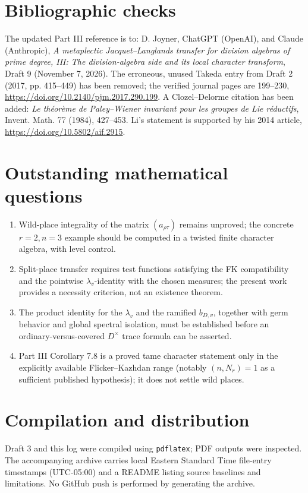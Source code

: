 \documentclass[11pt]{article}
\begin{document}
\section*{Bibliographic checks}
The updated Part III reference is to: D. Joyner, ChatGPT (OpenAI),
and Claude (Anthropic), \emph{A metaplectic Jacquet--Langlands transfer
for division algebras of prime degree, III: The division-algebra side
and its local character transform}, Draft 9 (November 7, 2026).
The erroneous, unused Takeda entry from Draft 2 (2017, pp. 415--449)
has been removed; the verified journal pages are 199--230,
\url{https://doi.org/10.2140/pjm.2017.290.199}.
A Clozel--Delorme citation has been added:
\emph{Le th\'eor\`eme de Paley--Wiener invariant pour les groupes de
Lie r\'eductifs}, Invent. Math. 77 (1984), 427--453.
Li's statement is supported by his 2014 article,
\url{https://doi.org/10.5802/aif.2915}.

\section*{Outstanding mathematical questions}
\begin{enumerate}[leftmargin=*]
\item Wild-place integrality of the matrix $(a_{\rho\tau})$ remains
unproved; the concrete $r=2,n=3$ example should be computed in a
twisted finite character algebra, with level control.
\item Split-place transfer requires test functions satisfying the
FK compatibility and the pointwise $\lambda_v$-identity with the
chosen measures; the present work provides a necessity criterion,
not an existence theorem.
\item The product identity for the $\lambda_v$ and the ramified
$b_{D,v}$, together with germ behavior and global spectral isolation,
must be established before an ordinary-versus-covered $D^\times$
trace formula can be asserted.
\item Part III Corollary 7.8 is a proved tame character statement only
in the explicitly available Flicker--Kazhdan range (notably
$(n,N_r)=1$ as a sufficient published hypothesis); it does not
settle wild places.
\end{enumerate}

\section*{Compilation and distribution}
Draft 3 and this log were compiled using \texttt{pdflatex};
PDF outputs were inspected. The accompanying archive carries local
Eastern Standard Time file-entry timestamps (UTC-05:00) and a
README listing source baselines and limitations.  No GitHub push is
performed by generating the archive.
\end{document}
